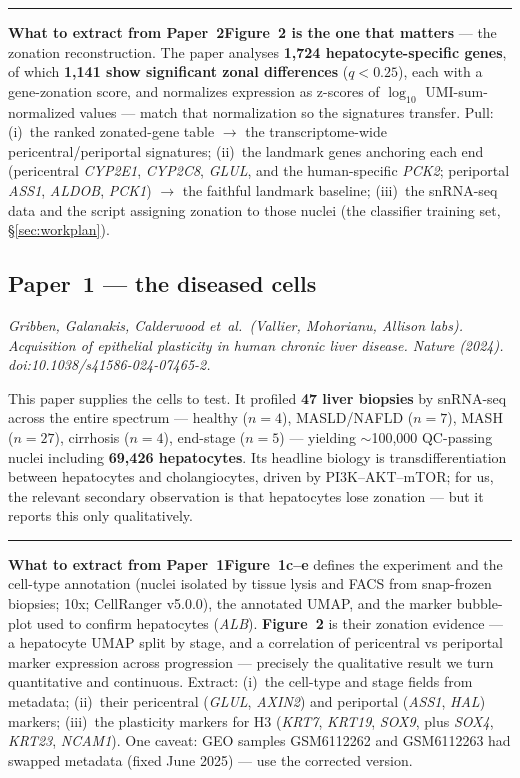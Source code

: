 \documentclass[11pt]{article}
\newcommand{\aside}[2]{\par\medskip\noindent\textcolor{teal0}{\rule{2pt}{\baselineskip}}\quad\textbf{\textcolor{teal0}{#1}}\quad #2\par\medskip}
\newcommand{\gene}[1]{\textit{#1}}
\begin{document}
\aside{What to extract from Paper~2}{\textbf{Figure~2 is the one that matters} --- the zonation
reconstruction. The paper analyses \textbf{1{,}724 hepatocyte-specific genes}, of which \textbf{1{,}141
show significant zonal differences} ($q<0.25$), each with a gene-zonation score, and normalizes
expression as z-scores of $\log_{10}$ UMI-sum-normalized values --- match that normalization so the
signatures transfer. Pull: (i)~the ranked zonated-gene table $\to$ the transcriptome-wide
pericentral/periportal signatures; (ii)~the landmark genes anchoring each end (pericentral
\gene{CYP2E1}, \gene{CYP2C8}, \gene{GLUL}, and the human-specific \gene{PCK2}; periportal \gene{ASS1},
\gene{ALDOB}, \gene{PCK1}) $\to$ the faithful landmark baseline; (iii)~the snRNA-seq data and the
script assigning zonation to those nuclei (the classifier training set, \S\ref{sec:workplan}).}

\subsection{Paper~1 --- the diseased cells}

\noindent\textit{Gribben, Galanakis, Calderwood et~al.\ (Vallier, Mohorianu, Allison labs).
Acquisition of epithelial plasticity in human chronic liver disease. Nature (2024).
doi:10.1038/s41586-024-07465-2.}

This paper supplies the cells to test. It profiled \textbf{47 liver biopsies} by snRNA-seq across the
entire spectrum --- healthy ($n=4$), MASLD/NAFLD ($n=7$), MASH ($n=27$), cirrhosis ($n=4$), end-stage
($n=5$) --- yielding $\sim$100{,}000 QC-passing nuclei including \textbf{69{,}426 hepatocytes}. Its
headline biology is transdifferentiation between hepatocytes and cholangiocytes, driven by
PI3K--AKT--mTOR; for us, the relevant secondary observation is that hepatocytes lose zonation --- but
it reports this only qualitatively.

\aside{What to extract from Paper~1}{\textbf{Figure~1c--e} defines the experiment and the cell-type
annotation (nuclei isolated by tissue lysis and FACS from snap-frozen biopsies; 10x; CellRanger
v5.0.0), the annotated UMAP, and the marker bubble-plot used to confirm hepatocytes (\gene{ALB}).
\textbf{Figure~2} is their zonation evidence --- a hepatocyte UMAP split by stage, and a correlation of
pericentral vs periportal marker expression across progression --- precisely the qualitative result we
turn quantitative and continuous. Extract: (i)~the cell-type and stage fields from metadata;
(ii)~their pericentral (\gene{GLUL}, \gene{AXIN2}) and periportal (\gene{ASS1}, \gene{HAL}) markers;
(iii)~the plasticity markers for H3 (\gene{KRT7}, \gene{KRT19}, \gene{SOX9}, plus \gene{SOX4},
\gene{KRT23}, \gene{NCAM1}). One caveat: GEO samples GSM6112262 and GSM6112263 had swapped metadata
(fixed June 2025) --- use the corrected version.}
\end{document}
